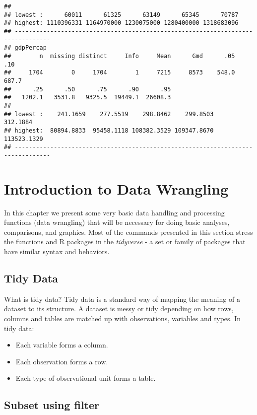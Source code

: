 \documentclass[
]{book}
\begin{document}
\begin{verbatim}
## 
## lowest :      60011      61325      63149      65345      70787
## highest: 1110396331 1164970000 1230075000 1280400000 1318683096
## --------------------------------------------------------------------------------
## gdpPercap 
##        n  missing distinct     Info     Mean      Gmd      .05      .10 
##     1704        0     1704        1     7215     8573    548.0    687.7 
##      .25      .50      .75      .90      .95 
##   1202.1   3531.8   9325.5  19449.1  26608.3 
## 
## lowest :    241.1659    277.5519    298.8462    299.8503    312.1884
## highest:  80894.8833  95458.1118 108382.3529 109347.8670 113523.1329
## --------------------------------------------------------------------------------
\end{verbatim}

\hypertarget{IntroDataWrangling}{%
\chapter{Introduction to Data Wrangling}\label{IntroDataWrangling}}

In this chapter we present some very basic data handling and processing functions (data wrangling) that will be necessary for doing basic analyses, comparisons, and graphics. Most of the commands presented in this section stress the functions and R packages in the \emph{tidyverse} - a set or family of packages that have similar syntax and behaviors.

\hypertarget{tidy-data}{%
\section{Tidy Data}\label{tidy-data}}

What is tidy data? Tidy data is a standard way of mapping the meaning of a dataset to its structure. A dataset is messy or tidy depending on how rows, columns and tables are matched up with observations, variables and types. In tidy data:

\begin{itemize}
\item
  Each variable forms a column.
\item
  Each observation forms a row.
\item
  Each type of observational unit forms a table.
\end{itemize}

\hypertarget{subset-using-filter}{%
\section{Subset using filter}\label{subset-using-filter}}
\end{document}

